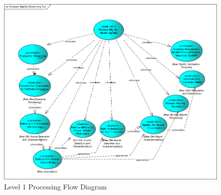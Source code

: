 \documentclass[12pt]{article}
\begin{document}
\begin{figure}
\includegraphics[angle=0,scale=0.44]{process_nightly_observing_run.png}
\caption{Level 1 Processing Flow Diagram\label{fig:level1}}
\end{figure}
\end{document}
